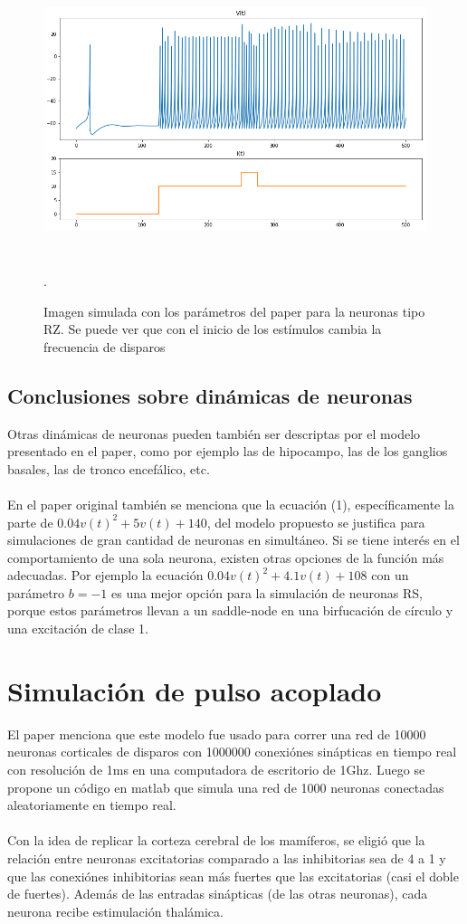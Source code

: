 \documentclass[12pt]{article}
\begin{document}
\begin{figure}[h!]
    \centering
        \includegraphics[height=8cm]{images/RZ.png}
    \caption[fontsize=2pt]{Imagen simulada con los parámetros del paper para la neuronas tipo RZ. Se puede ver que con el inicio de los estímulos cambia la frecuencia de disparos}.
\end{figure}

\subsection{Conclusiones sobre dinámicas de neuronas}

Otras dinámicas de neuronas pueden también ser descriptas por el modelo presentado en el paper, como por ejemplo las de hipocampo, las de los ganglios basales, las de tronco encefálico, etc. \\ \\
En el paper original también se menciona que la ecuación (1), específicamente la parte de $0.04 v(t)^2 + 5 v(t) + 140$, del modelo propuesto se justifica para simulaciones de gran cantidad de neuronas en simultáneo.
Si se tiene interés en el comportamiento de una sola neurona, existen otras opciones de la función más adecuadas. Por ejemplo la ecuación $0.04 v(t)^2 + 4.1 v(t) + 108$ con un parámetro $b = -1$ es una mejor opción para la simulación de neuronas RS, porque
estos parámetros llevan a un saddle-node en una birfucación de círculo y una excitación de clase 1. \cite{saddleNode}

\section{Simulación de pulso acoplado}
El paper menciona que este modelo fue usado para correr una red de 10000 neuronas corticales de disparos con 1000000 conexiónes sinápticas en tiempo real con resolución de 1ms en una computadora de escritorio de 1Ghz.
Luego se propone un código en matlab que simula una red de 1000 neuronas conectadas aleatoriamente en tiempo real. \\ \\
Con la idea de replicar la corteza cerebral de los mamíferos, se eligió que la relación entre neuronas excitatorias comparado a las inhibitorias sea de 4 a 1 y que las conexiónes inhibitorias sean más fuertes que las excitatorias (casi el doble de fuertes).
Además de las entradas sinápticas (de las otras neuronas), cada neurona recibe estimulación thalámica. \\
\end{document}

